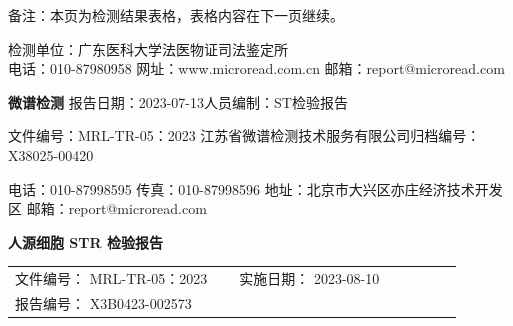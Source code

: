 \documentclass[UTF8,10pt,a4paper,fontset=fandol]{ctexart}
\newcommand{\fieldvalue}[1]{#1}
\begin{document}
\vspace{0.5em}

\noindent
备注：本页为检测结果表格，表格内容在下一页继续。 %

\begin{center}
\scriptsize
检测单位：广东医科大学法医物证司法鉴定所\\
电话：010-87980958 \qquad 网址：www.microread.com.cn \qquad 邮箱：report@microread.com
\end{center}

\newpage

\noindent
\textbf{微谱检测}\hfill
报告日期：2023-07-13\quad 人员编制：ST\quad 检验报告

\vspace{0.4em}
\noindent
文件编号：MRL-TR-05：2023\hfill
江苏省微谱检测技术服务有限公司\quad 归档编号：X38025-00420

\noindent
\dotfill

\vfill

\noindent
\footnotesize
电话：010-87998595\quad
传真：010-87998596\quad
地址：北京市大兴区亦庄经济技术开发区\quad
邮箱：report@microread.com

\newpage

\begin{center}
\Large\textbf{人源细胞 STR 检验报告}
\end{center}

\noindent
\begin{tabular}{p{0.46\linewidth}p{0.46\linewidth}}
文件编号：
\fieldvalue{MRL-TR-05：2023}
&
实施日期：
\fieldvalue{2023-08-10}
\\
报告编号：
\fieldvalue{X3B0423-002573}
&
\\
\end{tabular}

\vspace{0.5em}
\end{document}
